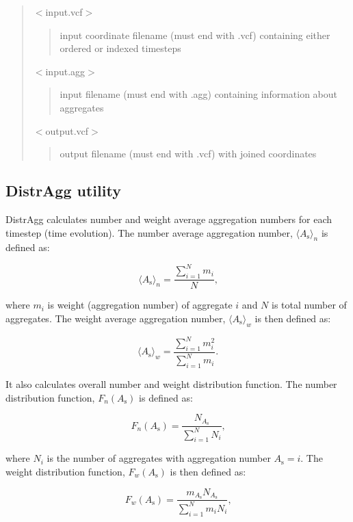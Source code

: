 \begin{quote}
{\ttfamily $<$input.\+vcf$>$} \begin{quote}
input coordinate filename (must end with {\ttfamily .vcf}) containing either ordered or indexed timesteps \end{quote}
{\ttfamily $<$input.\+agg$>$} \begin{quote}
input filename (must end with {\ttfamily .agg}) containing information about aggregates \end{quote}
{\ttfamily $<$output.\+vcf$>$} \begin{quote}
output filename (must end with {\ttfamily .vcf}) with joined coordinates \end{quote}
\end{quote}
\hypertarget{Common_DistrAgg}{}\subsection{Distr\+Agg utility}\label{Common_DistrAgg}
Distr\+Agg calculates number and weight average aggregation numbers for each timestep (time evolution).  
The number average aggregation number, $\langle A_{\mathrm{s}} \rangle_n$
is defined as:

\begin{equation}
\langle A_{\mathrm{s}} \rangle_n = \frac{\sum_{i=1}^N m_i}{N} \mbox{,}
\end{equation}

where $m_i$ is weight (aggregation number) of aggregate $i$ and $N$ is
total number of aggregates. The weight average aggregation number, $\langle
A_{\mathrm{s}} \rangle_w$ is then defined as:

\begin{equation}
\langle A_{\mathrm{s}} \rangle_w = \frac{\sum_{i=1}^N m_i^2}{\sum_{i=1}^N m_i} \mbox{.}
\end{equation}


It also calculates overall number and weight distribution function.  
The number distribution function, $F_n (A_{\mathrm{s}})$ is defined as:

\begin{equation}
F_n (A_{\mathrm{s}}) = \frac{N_{A_{\mathrm{s}}}}{\sum_{i=1}^N N_i} \mbox{,}
\end{equation}

where $N_i$ is the number of aggregates with aggregation number
$A_{\mathrm{s}} = i$.  The weight distribution function, $F_w
(A_{\mathrm{s}})$ is then defined as:

\begin{equation}
F_w(A_{\mathrm{s}}) = \frac{m_{A_{\mathrm{s}} }
N_{A_{\mathrm{s}}}}{\sum_{i=1}^N
m_i N_i} \mbox{,}
\end{equation}


